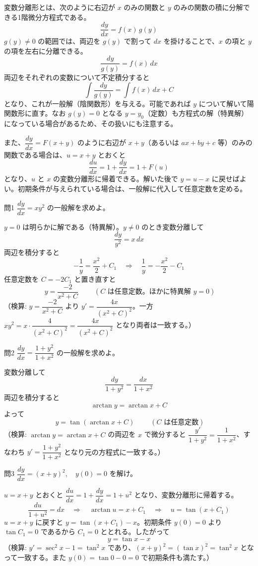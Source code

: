 \documentclass[a4paper,11pt]{article}
\begin{document}


\noindent
変数分離形とは、次のように右辺が $x$ のみの関数と $y$ のみの関数の積に分解できる1階微分方程式である。
\[
\frac{dy}{dx} = f(x)\,g(y)
\]
$g(y) \neq 0$ の範囲では、両辺を $g(y)$ で割って $dx$ を掛けることで、$x$ の項と $y$ の項を左右に分離できる。
\[
\frac{dy}{g(y)} = f(x)\,dx
\]
両辺をそれぞれの変数について不定積分すると
\[
\int \frac{dy}{g(y)} = \int f(x)\,dx + C
\]
となり、これが一般解（陰関数形）を与える。可能であれば $y$ について解いて陽関数形に直す。なお $g(y) = 0$ となる $y = y_{0}$（定数）も方程式の解（特異解）になっている場合があるため、その扱いにも注意する。

また、$\dfrac{dy}{dx} = F(x+y)$ のように右辺が $x+y$（あるいは $ax+by+c$ 等）のみの関数である場合は、$u = x+y$ とおくと
\[
\frac{du}{dx} = 1 + \frac{dy}{dx} = 1 + F(u)
\]
となり、$u$ と $x$ の変数分離形に帰着できる。解いた後で $y = u - x$ に戻せばよい。初期条件が与えられている場合は、一般解に代入して任意定数を定める。

\clearpage
\begin{mondaiboxS}{問1}
$\dfrac{dy}{dx} = xy^{2}$ の一般解を求めよ。
\end{mondaiboxS}
\kaitou
$y = 0$ は明らかに解である（特異解）。$y \neq 0$ のとき変数分離して
\[
\frac{dy}{y^{2}} = x\,dx
\]
両辺を積分すると
\[
-\frac{1}{y} = \frac{x^{2}}{2} + C_{1}
\quad\Longrightarrow\quad
\frac{1}{y} = -\frac{x^{2}}{2} - C_{1}
\]
任意定数を $C = -2C_{1}$ と置き直すと
\[
\boxed{\; y = \frac{-2}{x^{2}+C} \;}
\qquad (C \text{ は任意定数。ほかに特異解 } y=0)
\]
（検算: $y=\dfrac{-2}{x^{2}+C}$ より $y' = \dfrac{4x}{(x^{2}+C)^{2}}$。一方 $xy^{2} = x\cdot\dfrac{4}{(x^{2}+C)^{2}} = \dfrac{4x}{(x^{2}+C)^{2}}$ となり両者は一致する。）

\clearpage
\begin{mondaiboxS}{問2}
$\dfrac{dy}{dx} = \dfrac{1+y^{2}}{1+x^{2}}$ の一般解を求めよ。
\end{mondaiboxS}
\kaitou
変数分離して
\[
\frac{dy}{1+y^{2}} = \frac{dx}{1+x^{2}}
\]
両辺を積分すると
\[
\arctan y = \arctan x + C
\]
よって
\[
\boxed{\; y = \tan(\arctan x + C) \;}
\qquad (C \text{ は任意定数})
\]
（検算: $\arctan y = \arctan x + C$ の両辺を $x$ で微分すると $\dfrac{y'}{1+y^{2}} = \dfrac{1}{1+x^{2}}$、すなわち $y' = \dfrac{1+y^{2}}{1+x^{2}}$ となり元の方程式に一致する。）

\clearpage
\begin{mondaiboxS}{問3}
$\dfrac{dy}{dx} = (x+y)^{2}, \quad y(0) = 0$ を解け。
\end{mondaiboxS}
\kaitou
$u = x + y$ とおくと $\dfrac{du}{dx} = 1 + \dfrac{dy}{dx} = 1 + u^{2}$ となり、変数分離形に帰着する。
\[
\frac{du}{1+u^{2}} = dx
\quad\Longrightarrow\quad
\arctan u = x + C_{1}
\quad\Longrightarrow\quad
u = \tan(x+C_{1})
\]
$u = x+y$ に戻すと $y = \tan(x+C_{1}) - x$。初期条件 $y(0) = 0$ より $\tan C_{1} = 0$ であるから $C_{1} = 0$ ととれる。したがって
\[
\boxed{\; y = \tan x - x \;}
\]
（検算: $y' = \sec^{2}x - 1 = \tan^{2}x$ であり、$(x+y)^{2} = (\tan x)^{2} = \tan^{2}x$ となって一致する。また $y(0) = \tan 0 - 0 = 0$ で初期条件も満たす。）
\end{document}
